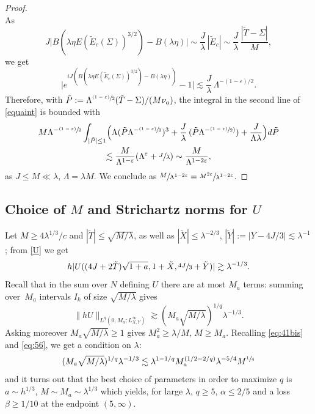 \documentclass[JEP,XML,SOM,Unicode,NoEqCountersInSection,NoFloatCountersInSection,published]{cedram}
\newcommand{\psfrac}[2]{\sfrac{(#1)}{#2}}
\let\epsilon\varepsilon
\theoremstyle{plain}
\theoremstyle{definition}
\begin{document}
\begin{proof}
\[\]
As
\[
J\bigl|B(\lambda\eta E(\tilde E_c(\Sigma))^{3/2})-B(\lambda\eta)\bigr|\sim \frac{J}{\lambda}\,|\tilde E_c|\sim\frac{J}{\lambda}\,\frac{|\tilde T-\Sigma|}{M},
\]
we get
\[
\bigl|e^{iJ(B(\lambda\eta E(\tilde E_c(\Sigma))^{3/2})-B(\lambda\eta))}-1\bigl|\lesssim \frac{J}{\lambda}\,\Lambda^{-(1-\epsilon)/2}.
\]
Therefore, with $\tilde P:=\Lambda^{\psfrac{1-\epsilon}{2}}(\tilde T-\Sigma)/(M\nu_a)$, the integral in the second line of \eqref{equaint} is bounded with
\begin{multline*}
M\Lambda^{-\psfrac{1-\epsilon}{2}}\int_{|\tilde P|\leq 1}\Bigl(\Lambda (\tilde P \Lambda^{-\psfrac{1-\epsilon}2})^3+\frac{J}{\lambda}\,(\tilde P\Lambda^{-\psfrac {1-\epsilon}2)})+\frac{J}{\Lambda\lambda}\Bigr)d\tilde P\\
\lesssim \frac{M}{\Lambda^{1-\epsilon}}(\Lambda^{\epsilon}+\sfrac{J}{\lambda})\sim \frac{M}{\Lambda^{1-2\epsilon}},
\end{multline*}
as $J\leq M\ll \lambda$, $\Lambda=\lambda M$. We conclude as $ \sfrac{M}{\Lambda^{1-2\epsilon}}=\sfrac{M^{2\epsilon}}{\lambda^{1-2\epsilon}}$.
\end{proof}

\subsection{Choice of $M$ and Strichartz norms for $U$}

Let $M\geq 4\lambda^{1/3}/c$ and $|\tilde T|\leq \sqrt{M/\lambda}$, as well as $|\tilde X|\leq \lambda^{-2/3}$, $|\tilde Y|:=|Y-4J/3|\lesssim \lambda^{-1}$; from \eqref{U} we get
\begin{equation*}
\label{eq:75}
h |U((4J+2\tilde T)\sqrt{1+a},1+\tilde X,\sfrac{4J}{3}+ \tilde Y)|\gtrsim \lambda^{-1/3} .
\end{equation*}
Recall that in the sum over $N$ defining $U$ there are at most $M_a$ terms: summing over~$M_a$ intervals $I_{k}$ of size $\sqrt{M/\lambda}$ gives
\begin{equation*}
\label{eq:76}
\|h U\|_{L^{q}(0,M_a; L^{\infty}_{X,Y})} \gtrsim (M_a\sqrt{M/\lambda})^{1/q}\lambda^{-1/3}.
\end{equation*}
Asking moreover $M_a\sqrt{M/\lambda}\geq 1$ gives $M_a^2\geq \lambda/M$, $M\geq M_a$.
Recalling \eqref{eq:41bis} and \eqref{eq:56}, we get a condition on $\lambda$:
\begin{equation*}
\label{eq:77}
(M_a\sqrt{M/\lambda})^{1/q} \lambda^{-1/3}\lesssim \lambda^{1-1/q} M_{a}^{(1/2-2/q)}\lambda^{-5/4} M^{\sfrac 14}
\end{equation*}
and it turns out that the best choice of parameters in order to maximize $q$ is $a\sim h^{1/3}$, $M\sim M_a\sim \lambda^{1/3}$ which yields, for large $\lambda$, $q\geq 5$, \eg $\alpha\leq 2/5$ and a loss $\beta\geq 1/10$ at the endpoint $(5,\infty)$.
\end{document}
